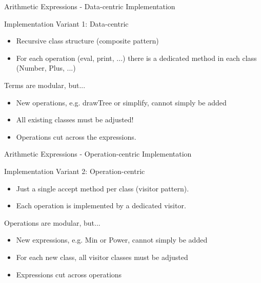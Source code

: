 \begin{frame}{Arithmetic Expressions - Data-centric Implementation}
	\begin{mycolumns}[widths={40,60},animation=none]
		\begin{definition}{Implementation Variant 1: Data-centric}
			\begin{itemize}
				\item Recursive class structure (composite pattern)
				\item For each operation (eval, print, ...) there is a dedicated method in each class (Number, Plus, ...) 				
			\end{itemize}
		\end{definition}
		\pause
		\begin{note}{Terms are modular, but...}
			\begin{itemize}
				\item New operations, e.g. drawTree or simplify, cannot simply be added
				\item All existing classes must be adjusted!
				\item Operations cut across the expressions.
			\end{itemize}
		\end{note}
	\mynextcolumn
		\begin{exampletight}{}
		\end{exampletight}
	\end{mycolumns}
\end{frame}

\begin{frame}{Arithmetic Expressions - Operation-centric Implementation}
	\begin{mycolumns}[widths={40,60},animation=none]
		\begin{definition}{Implementation Variant 2: Operation-centric}
			\begin{itemize}
				\item Just a single accept method per class (visitor pattern).
				\item Each operation is implemented by a dedicated visitor.				
			\end{itemize}
		\end{definition}
		\pause
		\begin{note}{Operations are modular, but...}
			\begin{itemize}
				\item New expressions, e.g. Min or Power, cannot simply be added
				\item For each new class, all visitor classes must be adjusted
				\item Expressions cut across operations
			\end{itemize}
		\end{note}
	\mynextcolumn
		\begin{exampletight}{}
			\pic[width=\linewidth]{method_centered}
		\end{exampletight}
	\end{mycolumns}
\end{frame}

